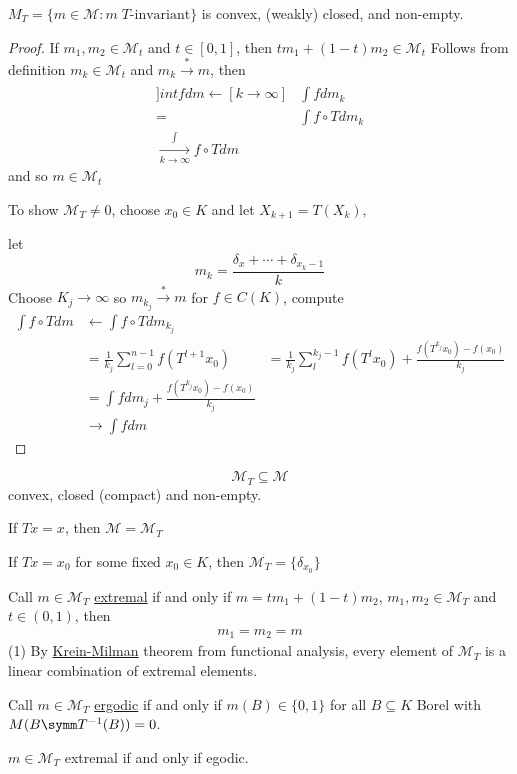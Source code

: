 \begin{theorem}
	$M_{T} = \{ m \in \mathcal{M} : m\; T \text{-invariant} \}$ is convex, (weakly) closed, and non-empty.
\end{theorem}

\begin{proof}
	If $m_1, m_2 \in \mathcal{M}_t$ and $t \in [0,1]$, then
	$t m_1 + (1-t) m_2 \in \mathcal{M}_t$
	Follows from definition
	$m_k \in \mathcal{M}_t$ and $m_k \xrightarrow[]{*} m$, then 
	\begin{align*}
		]int f dm \leftarrow[k \to \infty] &\int f dm_k \\
		= &\int f \circ T dm_k \\
		\xrightarrow[k \to \infty] \int f \circ T dm
	\end{align*} 
	and so $m \in \mathcal{M}_t$

	To show $\mathcal{M}_T \neq 0$, choose $x_0 \in K$ and let $X_{k+1} = T(X_k),$ 

	let  \[
		m_k = \frac{\delta_x + \cdots + \delta_{x_{k} - 1}}{k}
	\] 
	Choose $K_j \to \infty$ so $m_{k_j} \xrightarrow[]{*} m$ for $f \in C(K)$, compute 
	\begin{align*}
		\int f \circ T dm &\leftarrow \int f \circ T dm_{k_j} \\
						  &= \frac{1}{k_j} \sum_{l = 0}^{n-1} f(T^{l+1} x_0 )
						  &= \frac{1}{k_j} \sum_{l}^{k_j - 1} f (T^{l} x_0) + \frac{f (T^{k_j} x_0 ) - f(x_0)}{k_j} \\
						  &= \int f dm_j + \frac{f (T^{k_j} x_0 ) - f(x_0)}{k_j} \\
						  &\rightarrow \int f dm
	\end{align*}
\end{proof}


\[
	\mathcal{M}_T \subseteq \mathcal{M}
\] convex, closed (compact) and non-empty.

\begin{exercise}
	If $T x = x$, then $\mathcal{M} = \mathcal{M}_T$
\end{exercise}

\begin{exercise}
	If $T x = x_0$ for some fixed $x_0 \in K$, then $\mathcal{M}_T = \{ \delta_{x_0} \}$
\end{exercise}


\begin{definition}
	Call $m \in \mathcal{M}_T$ \underline{extremal} if and only if 
	$m = tm_1 + (1-t) m_2$, $m_1, m_2 \in \mathcal{M}_T$ and $t \in (0,1)$, then
	\begin{align}
		m_1 = m_2 = m
	\end{align} 
	(1) By \underline{Krein-Milman} theorem from functional analysis, every element of $\mathcal{M}_T$ is a linear combination of extremal elements.
\end{definition}


\begin{definition}
	Call $m \in \mathcal{M}_T$ \underline{ergodic} if and only if $m(B) \in \{0,1\}$ for all 
	$B \subseteq K$ Borel with $M(B \symm T^{-1}(B)) = 0$.
\end{definition}

\begin{theorem}
	$m \in \mathcal{M}_T$ extremal if and only if egodic.
\end{theorem}



